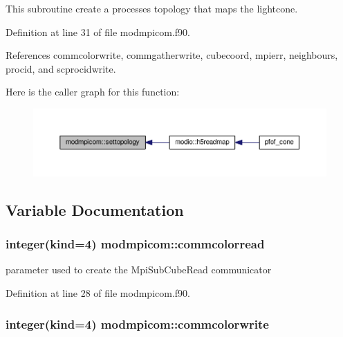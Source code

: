 This subroutine create a processes topology that maps the lightcone. 



Definition at line 31 of file modmpicom.\+f90.



References commcolorwrite, commgatherwrite, cubecoord, mpierr, neighbours, procid, and scprocidwrite.



Here is the caller graph for this function\+:\nopagebreak
\begin{figure}[H]
\begin{center}
\leavevmode
\includegraphics[width=350pt]{namespacemodmpicom_a158a13b594a854025da3c47f32a493de_icgraph}
\end{center}
\end{figure}




\subsection{Variable Documentation}
\subsubsection[{\texorpdfstring{commcolorread}{commcolorread}}]{\setlength{\rightskip}{0pt plus 5cm}integer(kind=4) modmpicom\+::commcolorread}\hypertarget{namespacemodmpicom_a0ba0397b7d92b456e11a65bce1f86e7c}{}\label{namespacemodmpicom_a0ba0397b7d92b456e11a65bce1f86e7c}


parameter used to create the Mpi\+Sub\+Cube\+Read communicator 



Definition at line 28 of file modmpicom.\+f90.

\subsubsection[{\texorpdfstring{commcolorwrite}{commcolorwrite}}]{\setlength{\rightskip}{0pt plus 5cm}integer(kind=4) modmpicom\+::commcolorwrite}\hypertarget{namespacemodmpicom_a10897435b88ede934389b5099b4a2f7f}{}\label{namespacemodmpicom_a10897435b88ede934389b5099b4a2f7f}


